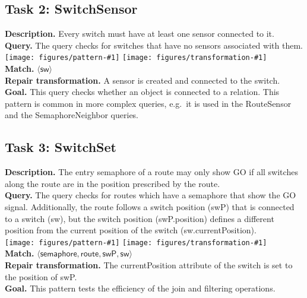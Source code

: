 \documentclass[submission,copyright,creativecommons]{eptcs}
\newcommand{\ttctransformation}[1]{
	\texttt{[image: figures/pattern-\#1]}
	\texttt{[image: figures/transformation-\#1]}
	\\
}
\begin{document}
\subsection{Task 2: SwitchSensor}
\label{switchsensor}
\textbf{Description.} Every switch must have at least one sensor connected to it. \\
\textbf{Query.} The query checks for switches that have no sensors associated with them. \\
\ttctransformation{switchsensor}
\textbf{Match.} $\langle \mathsf{sw} \rangle$ \\
\textbf{Repair transformation.} A \textsf{sensor} is created and connected to the \textsf{switch}. \\
\textbf{Goal.} This query checks whether an object is connected to a relation. This pattern is common in more complex queries, e.g.\ it is used in the \textsf{RouteSensor} and the \textsf{SemaphoreNeighbor} queries.


\subsection{Task 3: SwitchSet}
\label{switchset}
\textbf{Description.} The entry semaphore of a route may only show GO if all switches along the route are in the position prescribed by the route. \\
\textbf{Query.} The query checks for routes which have a semaphore that show the GO signal. Additionally, the route follows a switch position (\textsf{swP}) that is connected to a switch (\textsf{sw}), but the switch position (\textsf{swP.position}) defines a different position from the current position of the switch (\textsf{sw.currentPosition}). \\
\ttctransformation{switchset}
\textbf{Match.} $\langle \mathsf{semaphore}, \mathsf{route}, \mathsf{swP}, \mathsf{sw} \rangle$ \\
\textbf{Repair transformation.} The \textsf{currentPosition} attribute of the \textsf{switch} is set to the \textsf{position} of \textsf{swP}. \\
\textbf{Goal.} This pattern tests the efficiency of the join and filtering operations.
\end{document}
